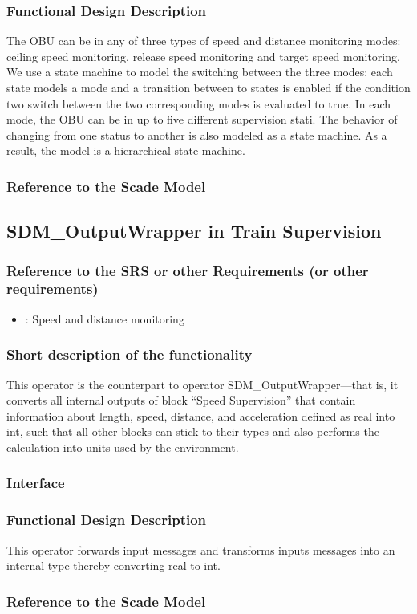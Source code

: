 \subsubsection{Functional Design Description}
The OBU can be in any of three types of speed and distance monitoring modes: ceiling speed monitoring, release speed monitoring and target speed monitoring. We use a state machine to model the switching between the three modes: each state models a mode and a transition between to states is enabled if the condition two switch between the two corresponding modes is evaluated to true. In each mode, the OBU can be in up to five different supervision stati. The behavior of changing from one status to another is also modeled as a state machine. As a result, the model is a hierarchical state machine.

\subsubsection{Reference to the Scade Model}

\subsection{SDM\_OutputWrapper in Train Supervision}

\subsubsection{Reference to the SRS or other Requirements (or other requirements)}
\begin{itemize}
	\item \cite[Chapt.~3.13]{subset-026}: Speed and distance monitoring 
\end{itemize}

\subsubsection{Short description of the functionality}
This operator is the counterpart to operator SDM\_OutputWrapper---that is, it converts all internal outputs of block ``Speed Supervision'' that contain information about length, speed, distance, and acceleration defined as real into int, such that all other blocks can stick to their types and also performs the calculation into units used by the environment.

\subsubsection{Interface}

\subsubsection{Functional Design Description}
This operator forwards input messages and transforms inputs messages into an internal type thereby converting real to int.
  
\subsubsection{Reference to the Scade Model}
